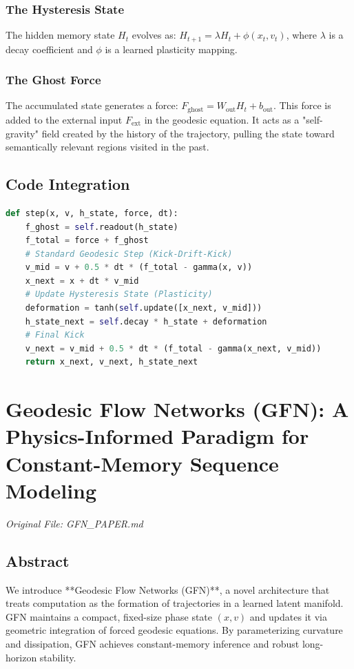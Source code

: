 \documentclass[11pt,a4paper]{report}
\begin{document}
\subsection{The Hysteresis State}
The hidden memory state $H_t$ evolves as: $H_{t+1} = \lambda H_t + \phi(x_t, v_t)$, where $\lambda$ is a decay coefficient and $\phi$ is a learned plasticity mapping.

\subsection{The Ghost Force}
The accumulated state generates a force: $F_{\text{ghost}} = W_{\text{out}} H_t + b_{\text{out}}$. This force is added to the external input $F_{\text{ext}}$ in the geodesic equation. It acts as a "self-gravity" field created by the history of the trajectory, pulling the state toward semantically relevant regions visited in the past.

\section{Code Integration}
\begin{lstlisting}[language=Python]
def step(x, v, h_state, force, dt):
    f_ghost = self.readout(h_state)
    f_total = force + f_ghost
    # Standard Geodesic Step (Kick-Drift-Kick)
    v_mid = v + 0.5 * dt * (f_total - gamma(x, v))
    x_next = x + dt * v_mid
    # Update Hysteresis State (Plasticity)
    deformation = tanh(self.update([x_next, v_mid]))
    h_state_next = self.decay * h_state + deformation
    # Final Kick
    v_next = v_mid + 0.5 * dt * (f_total - gamma(x_next, v_mid))
    return x_next, v_next, h_state_next
\end{lstlisting}

\chapter{Geodesic Flow Networks (GFN): A Physics-Informed Paradigm for Constant-Memory Sequence Modeling}
\textit{Original File: GFN\_PAPER.md}

\section{Abstract}
We introduce **Geodesic Flow Networks (GFN)**, a novel architecture that treats computation as the formation of trajectories in a learned latent manifold. GFN maintains a compact, fixed-size phase state $(x, v)$ and updates it via geometric integration of forced geodesic equations. By parameterizing curvature and dissipation, GFN achieves constant-memory inference and robust long-horizon stability.
\end{document}
